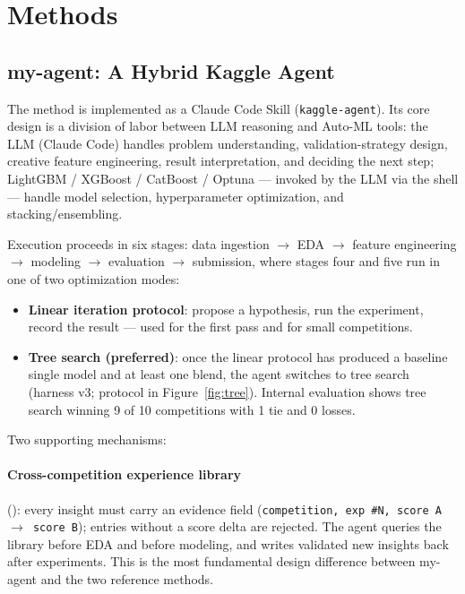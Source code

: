 \documentclass[11pt,a4paper]{article}
\begin{document}
\section{Methods}

\subsection{my-agent: A Hybrid Kaggle Agent}

The method is implemented as a Claude Code Skill (\texttt{kaggle-agent}). Its core design is a division of labor between LLM reasoning and Auto-ML tools: the LLM (Claude Code) handles problem understanding, validation-strategy design, creative feature engineering, result interpretation, and deciding the next step; LightGBM / XGBoost / CatBoost / Optuna --- invoked by the LLM via the shell --- handle model selection, hyperparameter optimization, and stacking/ensembling.

Execution proceeds in six stages: data ingestion $\to$ EDA $\to$ feature engineering $\to$ modeling $\to$ evaluation $\to$ submission, where stages four and five run in one of two optimization modes:

\begin{itemize}[leftmargin=*]
  \item \textbf{Linear iteration protocol}: propose a hypothesis, run the experiment, record the result --- used for the first pass and for small competitions.
  \item \textbf{Tree search (preferred)}: once the linear protocol has produced a baseline single model and at least one blend, the agent switches to tree search (harness v3; protocol in Figure~\ref{fig:tree}). Internal evaluation shows tree search winning 9 of 10 competitions with 1 tie and 0 losses.
\end{itemize}

Two supporting mechanisms:

\paragraph{Cross-competition experience library} (): every insight must carry an evidence field (\texttt{competition, exp \#N, score A $\to$ score B}); entries without a score delta are rejected. The agent queries the library before EDA and before modeling, and writes validated new insights back after experiments. This is the most fundamental design difference between my-agent and the two reference methods.
\end{document}
